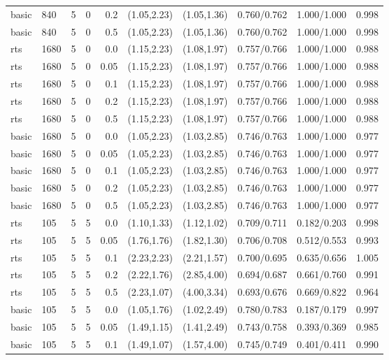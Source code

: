 \begin{tabular}{llrrrccccc}
basic & 840 & 5 & 0 & 0.2 & (1.05,2.23) & (1.05,1.36) & 0.760/0.762 & 1.000/1.000 & 0.998 \\
basic & 840 & 5 & 0 & 0.5 & (1.05,2.23) & (1.05,1.36) & 0.760/0.762 & 1.000/1.000 & 0.998 \\
rts & 1680 & 5 & 0 & 0.0 & (1.15,2.23) & (1.08,1.97) & 0.757/0.766 & 1.000/1.000 & 0.988 \\
rts & 1680 & 5 & 0 & 0.05 & (1.15,2.23) & (1.08,1.97) & 0.757/0.766 & 1.000/1.000 & 0.988 \\
rts & 1680 & 5 & 0 & 0.1 & (1.15,2.23) & (1.08,1.97) & 0.757/0.766 & 1.000/1.000 & 0.988 \\
rts & 1680 & 5 & 0 & 0.2 & (1.15,2.23) & (1.08,1.97) & 0.757/0.766 & 1.000/1.000 & 0.988 \\
rts & 1680 & 5 & 0 & 0.5 & (1.15,2.23) & (1.08,1.97) & 0.757/0.766 & 1.000/1.000 & 0.988 \\
basic & 1680 & 5 & 0 & 0.0 & (1.05,2.23) & (1.03,2.85) & 0.746/0.763 & 1.000/1.000 & 0.977 \\
basic & 1680 & 5 & 0 & 0.05 & (1.05,2.23) & (1.03,2.85) & 0.746/0.763 & 1.000/1.000 & 0.977 \\
basic & 1680 & 5 & 0 & 0.1 & (1.05,2.23) & (1.03,2.85) & 0.746/0.763 & 1.000/1.000 & 0.977 \\
basic & 1680 & 5 & 0 & 0.2 & (1.05,2.23) & (1.03,2.85) & 0.746/0.763 & 1.000/1.000 & 0.977 \\
basic & 1680 & 5 & 0 & 0.5 & (1.05,2.23) & (1.03,2.85) & 0.746/0.763 & 1.000/1.000 & 0.977 \\
rts & 105 & 5 & 5 & 0.0 & (1.10,1.33) & (1.12,1.02) & 0.709/0.711 & 0.182/0.203 & 0.998 \\
rts & 105 & 5 & 5 & 0.05 & (1.76,1.76) & (1.82,1.30) & 0.706/0.708 & 0.512/0.553 & 0.993 \\
rts & 105 & 5 & 5 & 0.1 & (2.23,2.23) & (2.21,1.57) & 0.700/0.695 & 0.635/0.656 & 1.005 \\
rts & 105 & 5 & 5 & 0.2 & (2.22,1.76) & (2.85,4.00) & 0.694/0.687 & 0.661/0.760 & 0.991 \\
rts & 105 & 5 & 5 & 0.5 & (2.23,1.07) & (4.00,3.34) & 0.693/0.676 & 0.669/0.822 & 0.964 \\
basic & 105 & 5 & 5 & 0.0 & (1.05,1.76) & (1.02,2.49) & 0.780/0.783 & 0.187/0.179 & 0.997 \\
basic & 105 & 5 & 5 & 0.05 & (1.49,1.15) & (1.41,2.49) & 0.743/0.758 & 0.393/0.369 & 0.985 \\
basic & 105 & 5 & 5 & 0.1 & (1.49,1.07) & (1.57,4.00) & 0.745/0.749 & 0.401/0.411 & 0.990 \\

\end{tabular}
